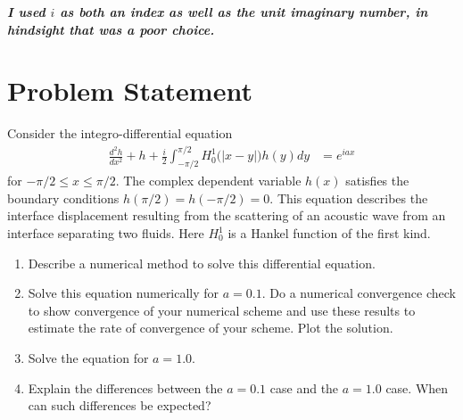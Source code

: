 \documentclass[10pt]{article}
\begin{document}

\pagestyle{fancy}
\fancyhf{}
\setlength\headheight{12pt}

\textbf{\textit{I used $i$ as both an index as well as the unit imaginary number, in hindsight that was a poor choice.}}

\section*{Problem Statement}
Consider the integro-differential equation
\begin{align}
    \frac{d^2h}{dx^2} + h + \frac{i}{2} \int_{-\pi/2}^{\pi/2} H^1_0 \big( |x - y| \big) h(y)dy &= e^{iax}
\end{align}
for $-\pi/2 \leq x \leq \pi/2$. 
The complex dependent variable $h(x)$ satisfies the boundary conditions $h(\pi/2) = h(-\pi/2) = 0$. 
This equation describes the interface displacement resulting from the scattering of an acoustic wave from an interface separating two fluids.
Here $H^1_0$ is a Hankel function of the first kind.
\begin{enumerate}
    \item Describe a numerical method to solve this differential equation.
    
    \item Solve this equation numerically for $a = 0.1$. 
    Do a numerical convergence check to show convergence of your numerical scheme and use these results to estimate the rate of convergence of your scheme.
    Plot the solution.

    \item Solve the equation for $a = 1.0$.

    \item Explain the differences between the $a = 0.1$ case and the $a = 1.0$ case.
    When can such differences be expected?

\end{enumerate}
\end{document}
